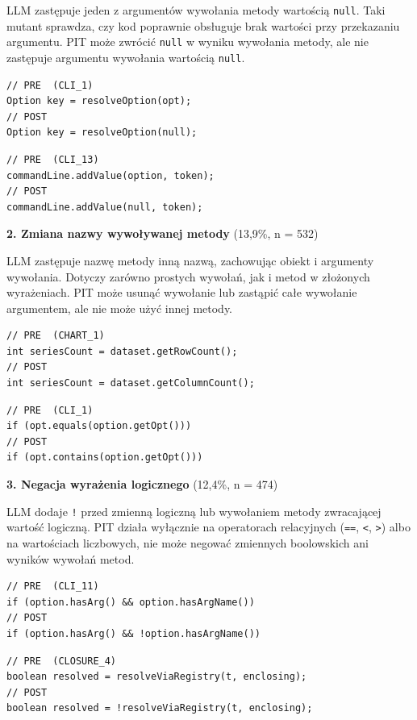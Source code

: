 \documentclass[12pt,a4paper,oldfontcommands]{memoir}
\theoremstyle{plain}
\theoremstyle{definition}
\theoremstyle{remark}
\begin{document}
    LLM zastępuje jeden z argumentów wywołania metody wartością \texttt{null}.
    Taki mutant sprawdza, czy kod poprawnie obsługuje brak wartości przy przekazaniu argumentu.
    PIT może zwrócić \texttt{null} w wyniku wywołania metody, ale nie zastępuje argumentu wywołania wartością \texttt{null}.

    \begin{lstlisting}
// PRE  (CLI_1)
Option key = resolveOption(opt);
// POST
Option key = resolveOption(null);
    \end{lstlisting}

    \begin{lstlisting}
// PRE  (CLI_13)
commandLine.addValue(option, token);
// POST
commandLine.addValue(null, token);
    \end{lstlisting}

    \textbf{2. Zmiana nazwy wywoływanej metody} (13,9\%, n = 532)

    LLM zastępuje nazwę metody inną nazwą, zachowując obiekt i argumenty wywołania.
    Dotyczy zarówno prostych wywołań, jak i metod w złożonych wyrażeniach.
    PIT może usunąć wywołanie lub zastąpić całe wywołanie argumentem, ale nie może użyć innej metody.

    \begin{lstlisting}
// PRE  (CHART_1)
int seriesCount = dataset.getRowCount();
// POST
int seriesCount = dataset.getColumnCount();
    \end{lstlisting}

    \begin{lstlisting}
// PRE  (CLI_1)
if (opt.equals(option.getOpt()))
// POST
if (opt.contains(option.getOpt()))
    \end{lstlisting}

    \textbf{3. Negacja wyrażenia logicznego} (12,4\%, n = 474)

    LLM dodaje \texttt{!} przed zmienną logiczną lub wywołaniem metody zwracającej wartość logiczną.
    PIT działa wyłącznie na operatorach relacyjnych (\texttt{==}, \texttt{\textless}, \texttt{\textgreater}) albo na wartościach liczbowych, nie może negować zmiennych boolowskich ani wyników wywołań metod.

    \begin{lstlisting}
// PRE  (CLI_11)
if (option.hasArg() && option.hasArgName())
// POST
if (option.hasArg() && !option.hasArgName())
    \end{lstlisting}

    \begin{lstlisting}
// PRE  (CLOSURE_4)
boolean resolved = resolveViaRegistry(t, enclosing);
// POST
boolean resolved = !resolveViaRegistry(t, enclosing);
    \end{lstlisting}
\end{document}
